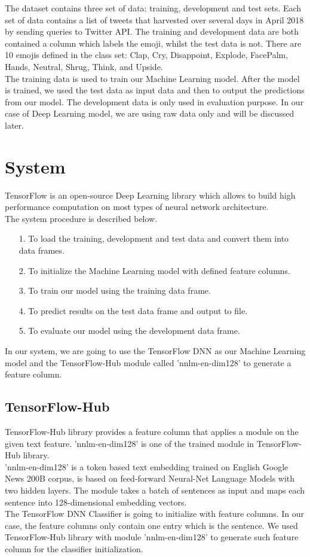 \documentclass[12pt]{article}
\begin{document}
The dataset contains three set of data: training, development and test sets. Each set of data contains a list of tweets that harvested over several days in April 2018 by sending queries to Twitter API. The training and development data are both contained a column which labels the emoji, whilst the test data is not. There are 10 emojis defined in the class set: Clap, Cry, Disappoint, Explode, FacePalm, Hands, Neutral, Shrug, Think, and Upside.
\medskip \\
The training data is used to train our Machine Learning model. After the model is trained, we used the test data as input data and then to output the predictions from our model. The development data is only used in evaluation purpose. In our case of Deep Learning model, we are using raw data only and will be discussed later.

\section{System}

TensorFlow is an open-source Deep Learning library which allows to build high performance computation on most types of neural network architecture. 
\medskip \\
The system procedure is described below.
\begin{itemize}
\item[1.] To load the training, development and test data and convert them into data frames.
\item[2.] To initialize the Machine Learning model with defined feature columns.
\item[3.] To train our model using the training data frame.
\item[4.] To predict results on the test data frame and output to file.
\item[5.] To evaluate our model using the development data frame.
\end{itemize}
In our system, we are going to use the TensorFlow DNN as our Machine Learning model and the TensorFlow-Hub module called 'nnlm-en-dim128' to generate a feature column.

\subsection{TensorFlow-Hub}

TensorFlow-Hub library provides a feature column that applies a module on the given text feature. 'nnlm-en-dim128' is one of the trained module in TensorFlow-Hub library.
\medskip \\
'nnlm-en-dim128' is a token based text embedding trained on English Google News 200B corpus, is based on feed-forward Neural-Net Language Models \cite{nnlm} with two hidden layers. The module takes a batch of sentences as input and maps each sentence into 128-dimensional embedding vectors.
\medskip \\
The TensorFlow DNN Classifier is going to initialize with feature columns. In our case, the feature columns only contain one entry which is the sentence. We used TensorFlow-Hub library with module 'nnlm-en-dim128' to generate such feature column for the classifier initialization.
\end{document}
